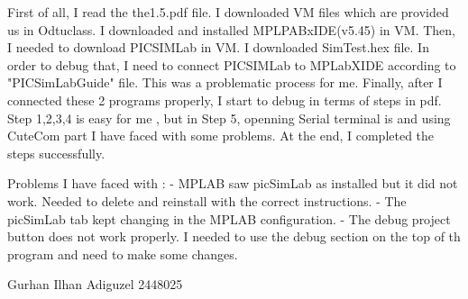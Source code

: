 First of all, I read the the1.5.pdf file.
I downloaded VM files which are provided us in Odtuclass.
I downloaded and installed MPLPABxIDE(v5.45) in VM.
Then, I needed to download PICSIMLab in VM.
I downloaded SimTest.hex file.
In order to debug that, I need to connect PICSIMLab to MPLabXIDE according to "PICSimLabGuide" file.
This was a problematic process for me.
Finally, after I connected these 2 programs properly, I start to debug in terms of steps in pdf.
Step 1,2,3,4 is easy for me , but in Step 5, openning Serial terminal is and using CuteCom part I have faced with some problems.
At the end, I completed the steps successfully.
 
Problems I have faced with :
- MPLAB saw picSimLab as installed but it did not work. Needed to delete and reinstall with the correct instructions.
- The picSimLab tab kept changing in the MPLAB configuration.
- The debug project button  does not work properly. I needed to use the debug section on the top of th program and need to make some changes.

Gurhan Ilhan Adiguzel 2448025
